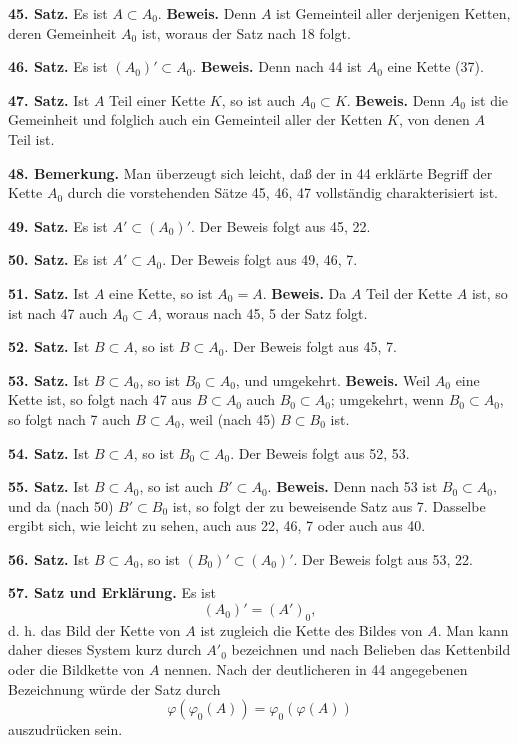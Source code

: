 \documentclass[11pt]{article}
\newcommand{\partof}{\mathrel{\subset}}
\begin{document}
\noindent\textbf{45. Satz.} Es ist $A\partof A_0$. \textbf{Beweis.} Denn $A$ ist Gemeinteil aller derjenigen Ketten, deren Gemeinheit $A_0$ ist, woraus der Satz nach 18 folgt.

\noindent\textbf{46. Satz.} Es ist $(A_0)'\partof A_0$. \textbf{Beweis.} Denn nach 44 ist $A_0$ eine Kette (37).

\noindent\textbf{47. Satz.} Ist $A$ Teil einer Kette $K$, so ist auch $A_0\partof K$. \textbf{Beweis.} Denn $A_0$ ist die Gemeinheit und folglich auch ein Gemeinteil aller der Ketten $K$, von denen $A$ Teil ist.

\noindent\textbf{48. Bemerkung.} Man überzeugt sich leicht, daß der in 44 erklärte Begriff der Kette $A_0$ durch die vorstehenden Sätze 45, 46, 47 vollständig charakterisiert ist.

\noindent\textbf{49. Satz.} Es ist $A'\partof(A_0)'$. Der Beweis folgt aus 45, 22.

\noindent\textbf{50. Satz.} Es ist $A'\partof A_0$. Der Beweis folgt aus 49, 46, 7.

\noindent\textbf{51. Satz.} Ist $A$ eine Kette, so ist $A_0=A$. \textbf{Beweis.} Da $A$ Teil der Kette $A$ ist, so ist nach 47 auch $A_0\partof A$, woraus nach 45, 5 der Satz folgt.

\noindent\textbf{52. Satz.} Ist $B\partof A$, so ist $B\partof A_0$. Der Beweis folgt aus 45, 7.

\noindent\textbf{53. Satz.} Ist $B\partof A_0$, so ist $B_0\partof A_0$, und umgekehrt. \textbf{Beweis.} Weil $A_0$ eine Kette ist, so folgt nach 47 aus $B\partof A_0$ auch $B_0\partof A_0$; umgekehrt, wenn $B_0\partof A_0$, so folgt nach 7 auch $B\partof A_0$, weil (nach 45) $B\partof B_0$ ist.

\noindent\textbf{54. Satz.} Ist $B\partof A$, so ist $B_0\partof A_0$. Der Beweis folgt aus 52, 53.

\noindent\textbf{55. Satz.} Ist $B\partof A_0$, so ist auch $B'\partof A_0$. \textbf{Beweis.} Denn nach 53 ist $B_0\partof A_0$, und da (nach 50) $B'\partof B_0$ ist, so folgt der zu beweisende Satz aus 7. Dasselbe ergibt sich, wie leicht zu sehen, auch aus 22, 46, 7 oder auch aus 40.

\noindent\textbf{56. Satz.} Ist $B\partof A_0$, so ist $(B_0)'\partof(A_0)'$. Der Beweis folgt aus 53, 22.

\noindent\textbf{57. Satz und Erklärung.} Es ist
\[
(A_0)'=(A')_0,
\]
d. h. das Bild der Kette von $A$ ist zugleich die Kette des Bildes von $A$. Man kann daher dieses System kurz durch $A'_0$ bezeichnen und nach Belieben das Kettenbild oder die Bildkette von $A$ nennen. Nach der deutlicheren in 44 angegebenen Bezeichnung würde der Satz durch
\[
\varphi(\varphi_0(A))=\varphi_0(\varphi(A))
\]
auszudrücken sein.
\end{document}

